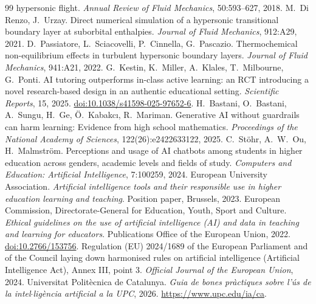 \documentclass[11pt]{article}
\begin{document}
\begin{thebibliography}{99}
hypersonic flight. \emph{Annual Review of Fluid Mechanics}, 50:593--627, 2018.
 M.\ Di Renzo, J.\ Urzay. Direct numerical simulation of a
hypersonic transitional boundary layer at suborbital enthalpies. \emph{Journal of Fluid
Mechanics}, 912:A29, 2021.
 D.\ Passiatore, L.\ Sciacovelli, P.\ Cinnella, G.\ Pascazio.
Thermochemical non-equilibrium effects in turbulent hypersonic boundary layers.
\emph{Journal of Fluid Mechanics}, 941:A21, 2022.
 G.\ Kestin, K.\ Miller, A.\ Klales, T.\ Milbourne, G.\ Ponti. AI tutoring
outperforms in-class active learning: an RCT introducing a novel research-based design in an
authentic educational setting. \emph{Scientific Reports}, 15, 2025.
\href{https://doi.org/10.1038/s41598-025-97652-6}{doi:10.1038/s41598-025-97652-6}.
 H.\ Bastani, O.\ Bastani, A.\ Sungu, H.\ Ge, \"O.\ Kabakc\i{}, R.\
Mariman. Generative AI without guardrails can harm learning: Evidence from high school
mathematics. \emph{Proceedings of the National Academy of Sciences}, 122(26):e2422633122,
2025.
 C.\ St\"ohr, A.\ W.\ Ou, H.\ Malmstr\"om. Perceptions and usage of AI
chatbots among students in higher education across genders, academic levels and fields of
study. \emph{Computers and Education: Artificial Intelligence}, 7:100259, 2024.
\bibitem{EUA2023} European University Association. \emph{Artificial intelligence tools and
their responsible use in higher education learning and teaching}. Position paper,
Brussels, 2023.
 European Commission, Directorate-General for Education, Youth, Sport and
Culture. \emph{Ethical guidelines on the use of artificial intelligence (AI) and data in
teaching and learning for educators}. Publications Office of the European Union, 2022.
\href{https://data.europa.eu/doi/10.2766/153756}{doi:10.2766/153756}.
\bibitem{AIAct2024} Regulation (EU) 2024/1689 of the European Parliament and of the Council
laying down harmonised rules on artificial intelligence (Artificial Intelligence Act),
Annex III, point 3. \emph{Official Journal of the European Union}, 2024.
\bibitem{UPCAI2026} Universitat Polit\`ecnica de Catalunya. \emph{Guia de bones pr\`actiques
sobre l'\'us de la intel$\cdot$lig\`encia artificial a la UPC}, 2026.
\url{https://www.upc.edu/ia/ca}.

\end{thebibliography}
\end{document}
